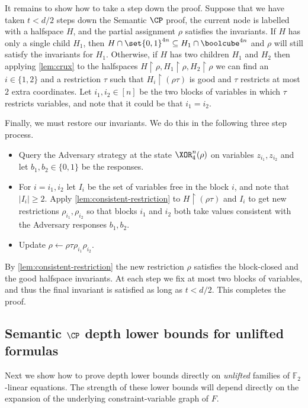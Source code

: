 	
It remains to show how to take a step down the proof. 
Suppose that we have taken $t < d/2$ steps down the Semantic $\CP$ proof, the current node is labelled with a halfspace $H$, and the partial assignment $\rho$ satisfies the invariants.
If $H$ has only a single child $H_1$, then $H \cap \set{0,1}^{4n} \subseteq H_1 \cap \boolcube^{4n}$ and $\rho$ will still satisfy the invariants for $H_1$.
Otherwise, if $H$ has two children $H_1$ and $H_2$ then applying \autoref{lem:crux} to the halfspaces $H \restriction \rho, H_1 \restriction \rho, H_2 \restriction \rho$ we can find an $i \in \{1,2\}$ and a restriction $\tau$  such that $H_i \restriction (\rho\tau)$ is good and $\tau$ restricts at most $2$ extra coordinates.
Let $i_1, i_2 \in [n]$ be the two blocks of variables in which $\tau$ restricts variables, and note that it could be that $i_1 = i_2$.
	
Finally, we must restore our invariants.
We do this in the following three step process.
\begin{itemize}
	\item Query the Adversary strategy at the state $\XOR_4^n(\rho)$ on variables $z_{i_1}, z_{i_2}$ and let $b_1, b_2 \in \{0,1\}$ be the responses.
	\item For $i = i_1, i_2$ let $I_i$ be the set of variables free in the block $i$, and note that $|I_i| \geq 2$. 
		Apply \autoref{lem:consistent-restriction} to $H \restriction (\rho\tau)$ and $I_i$ to get new restrictions $\rho_{i_1}, \rho_{i_2}$ so that blocks $i_1$ and $i_2$ both take values consistent with the Adversary responses $b_1, b_2$.
	\item Update $\rho \leftarrow \rho\tau\rho_{i_1}\rho_{i_2}$.
\end{itemize} 
By \autoref{lem:consistent-restriction} the new restriction $\rho$ satisfies the block-closed and the good halfspace invariants.
At each step we fix at most two blocks of variables, and thus the final invariant is satisfied as long as $t < d/2$.
This completes the proof.




\subsection{Semantic \texorpdfstring{$\CP$}{CP} depth lower bounds for unlifted
  formulas}
Next we show how to prove depth lower bounds directly on \emph{unlifted} families of $\mathbb{F}_2$-linear equations. The strength of these lower bounds will depend directly on the expansion of the underlying constraint-variable graph of $F$. 

